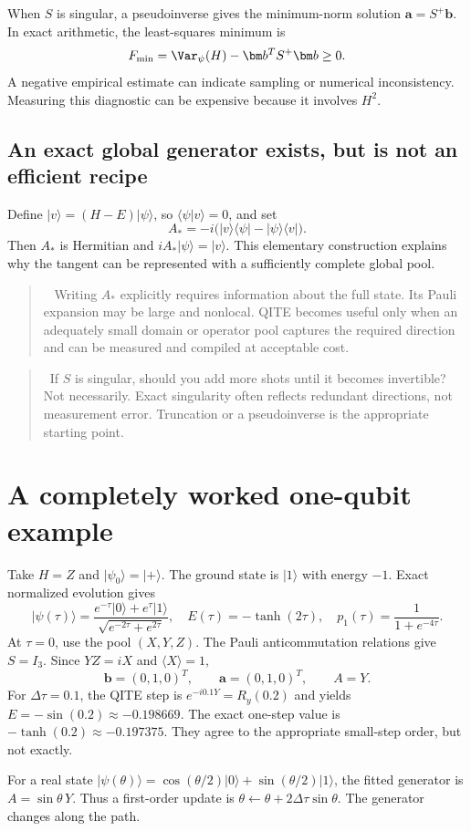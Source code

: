 \documentclass[11pt,a4paper]{article}
\newcommand{\ket}[1]{\lvert #1\rangle}
\newcommand{\bra}[1]{\langle #1\rvert}
\newcommand{\braket}[2]{\langle #1\vert #2\rangle}
\newcommand{\ex}[1]{\langle #1\rangle}
\newcommand{\dt}{\Delta\tau}
\newcommand{\lesson}[2]{\clearpage\section{#1}\label{#2}}
\newenvironment{idea}[1][Main idea]{\par\smallskip\begin{quotation}\noindent{\bfseries\textcolor{keyblue}{#1.}}\ }{\end{quotation}\smallskip}
\newcommand{\checkpoint}[1]{\begin{idea}[Pause and check]#1\end{idea}}
\begin{document}
When $S$ is singular, a pseudoinverse gives the minimum-norm solution $\bm a=S^+\bm b$. In exact arithmetic, the least-squares minimum is
\[
F_{\min}=\Var_\psi(H)-\bm b^TS^+\bm b\ge0.
\]
A negative empirical estimate can indicate sampling or numerical inconsistency. Measuring this diagnostic can be expensive because it involves $H^2$.

\subsection*{An exact global generator exists, but is not an efficient recipe}
Define $\ket{v}=(H-E)\ket{\psi}$, so $\braket{\psi}{v}=0$, and set
\[
A_*=-i\bigl(\ket{v}\bra{\psi}-\ket{\psi}\bra{v}\bigr).
\]
Then $A_*$ is Hermitian and $iA_*\ket{\psi}=\ket{v}$. This elementary construction explains why the tangent can be represented with a sufficiently complete global pool.

\begin{idea}[Existence is not efficiency]
Writing $A_*$ explicitly requires information about the full state. Its Pauli expansion may be large and nonlocal. QITE becomes useful only when an adequately small domain or operator pool captures the required direction and can be measured and compiled at acceptable cost.
\end{idea}

\checkpoint{If $S$ is singular, should you add more shots until it becomes invertible? Not necessarily. Exact singularity often reflects redundant directions, not measurement error. Truncation or a pseudoinverse is the appropriate starting point.}

\lesson{A completely worked one-qubit example}{sec:onequbit}
Take $H=Z$ and $\ket{\psi_0}=\ket{+}$. The ground state is $\ket{1}$ with energy $-1$. Exact normalized evolution gives
\[
\ket{\psi(\tau)}=\frac{e^{-\tau}\ket{0}+e^{\tau}\ket{1}}
{\sqrt{e^{-2\tau}+e^{2\tau}}},\quad
E(\tau)=-\tanh(2\tau),\quad p_1(\tau)=\frac{1}{1+e^{-4\tau}}.
\]
At $\tau=0$, use the pool $(X,Y,Z)$. The Pauli anticommutation relations give $S=I_3$. Since $YZ=iX$ and $\ex{X}=1$,
\[
\bm b=(0,1,0)^T,\qquad\bm a=(0,1,0)^T,\qquad A=Y.
\]
For $\dt=0.1$, the QITE step is $e^{-i0.1Y}=R_y(0.2)$ and yields $E=-\sin(0.2)\approx-0.198669$. The exact one-step value is $-\tanh(0.2)\approx-0.197375$. They agree to the appropriate small-step order, but not exactly.

For a real state $\ket{\psi(\theta)}=\cos(\theta/2)\ket{0}+\sin(\theta/2)\ket{1}$, the fitted generator is $A=\sin\theta\,Y$. Thus a first-order update is $\theta\leftarrow\theta+2\dt\sin\theta$. The generator changes along the path.
\end{document}
